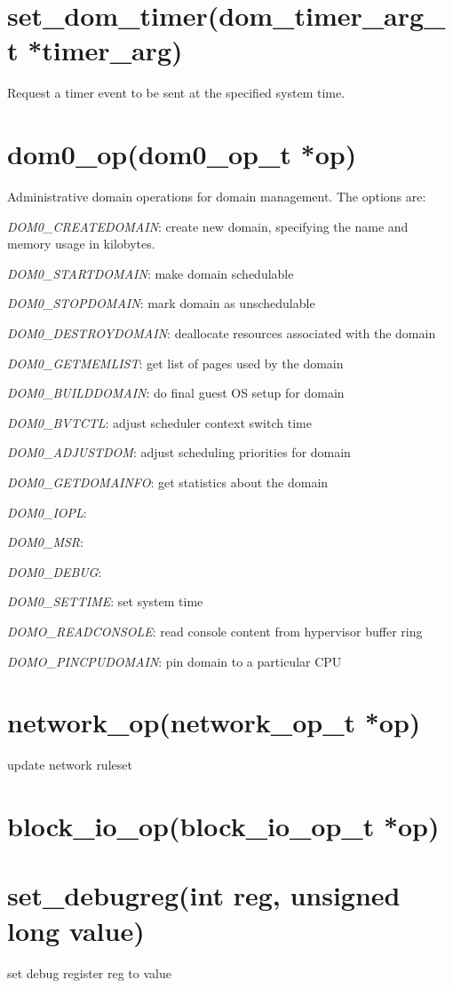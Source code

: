 \documentclass[11pt,twoside,final,openright]{xenstyle}
\begin{document}
\section{ set\_dom\_timer(dom\_timer\_arg\_t *timer\_arg)} 
Request a timer event to be sent at the specified system time.

\section{ dom0\_op(dom0\_op\_t *op)} 
Administrative domain operations for domain management. The options are:

{\it DOM0\_CREATEDOMAIN}: create new domain, specifying the name and memory usage
in kilobytes.

{\it DOM0\_STARTDOMAIN}: make domain schedulable

{\it DOM0\_STOPDOMAIN}: mark domain as unschedulable

{\it DOM0\_DESTROYDOMAIN}: deallocate resources associated with the domain

{\it DOM0\_GETMEMLIST}: get list of pages used by the domain

{\it DOM0\_BUILDDOMAIN}: do final guest OS setup for domain

{\it DOM0\_BVTCTL}: adjust scheduler context switch time

{\it DOM0\_ADJUSTDOM}: adjust scheduling priorities for domain

{\it DOM0\_GETDOMAINFO}: get statistics about the domain

{\it DOM0\_IOPL}:

{\it DOM0\_MSR}:

{\it DOM0\_DEBUG}:

{\it DOM0\_SETTIME}: set system time

{\it DOMO\_READCONSOLE}: read console content from hypervisor buffer ring

{\it DOMO\_PINCPUDOMAIN}: pin domain to a particular CPU


\section{network\_op(network\_op\_t *op)} 
update network ruleset

\section{ block\_io\_op(block\_io\_op\_t *op)}

\section{ set\_debugreg(int reg, unsigned long value)}
set debug register reg to value
\end{document}
